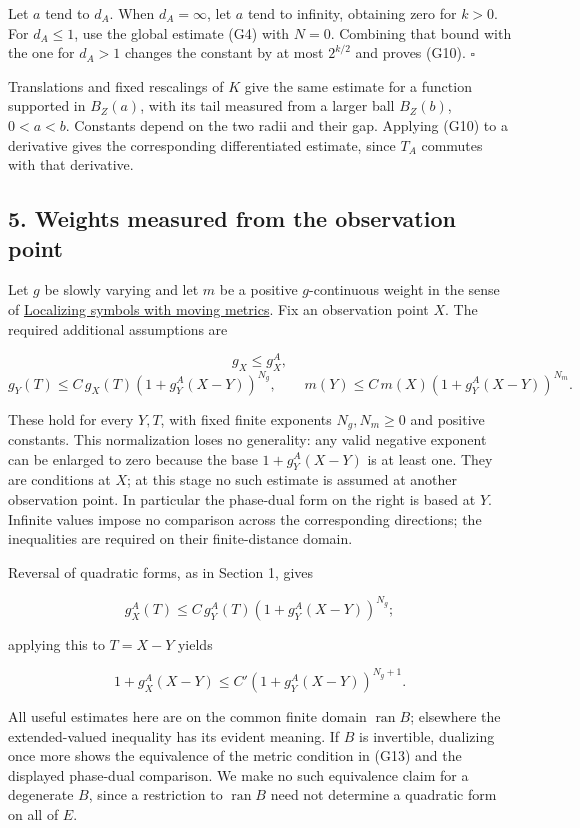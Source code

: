 \documentclass[
  11pt,
]{article}
\begin{document}
Let \(a\) tend to \(d_A\). When \(d_A=\infty\), let \(a\) tend to
infinity, obtaining zero for \(k>0\). For \(d_A\leq1\), use the global
estimate (G4) with \(N=0\). Combining that bound with the one for
\(d_A>1\) changes the constant by at most \(2^{k/2}\) and proves (G10).
\(\square\)

Translations and fixed rescalings of \(K\) give the same estimate for a
function supported in \(B_Z(a)\), with its tail measured from a larger
ball \(B_Z(b)\), \(0<a<b\). Constants depend on the two radii and their
gap. Applying (G10) to a derivative gives the corresponding
differentiated estimate, since \(T_A\) commutes with that derivative.

\subsection{5. Weights measured from the observation
point}\label{weights-measured-from-the-observation-point}

Let \(g\) be slowly varying and let \(m\) be a positive \(g\)-continuous
weight in the sense of \href{metric-localization.pdf}{Localizing symbols
with moving metrics}. Fix an observation point \(X\). The required
additional assumptions are

\[
g_X\leq g_X^A,                                                \tag{G12}
\] \[
g_Y(T)\leq C\,g_X(T)(1+g_Y^A(X-Y))^{N_g},\qquad
m(Y)\leq C\,m(X)(1+g_Y^A(X-Y))^{N_m}.                         \tag{G13}
\]

These hold for every \(Y,T\), with fixed finite exponents
\(N_g,N_m\geq0\) and positive constants. This normalization loses no
generality: any valid negative exponent can be enlarged to zero because
the base \(1+g_Y^A(X-Y)\) is at least one. They are conditions at \(X\);
at this stage no such estimate is assumed at another observation point.
In particular the phase-dual form on the right is based at
\textbf{\(Y\)}. Infinite values impose no comparison across the
corresponding directions; the inequalities are required on their
finite-distance domain.

Reversal of quadratic forms, as in Section 1, gives

\[
g_X^A(T)\leq C\,g_Y^A(T)(1+g_Y^A(X-Y))^{N_g};
\]

applying this to \(T=X-Y\) yields

\[
1+g_X^A(X-Y)\leq C'(1+g_Y^A(X-Y))^{N_g+1}.                  \tag{G14}
\]

All useful estimates here are on the common finite domain
\(\operatorname{ran}B\); elsewhere the extended-valued inequality has
its evident meaning. If \(B\) is invertible, dualizing once more shows
the equivalence of the metric condition in (G13) and the displayed
phase-dual comparison. We make no such equivalence claim for a
degenerate \(B\), since a restriction to \(\operatorname{ran}B\) need
not determine a quadratic form on all of \(E\).
\end{document}

